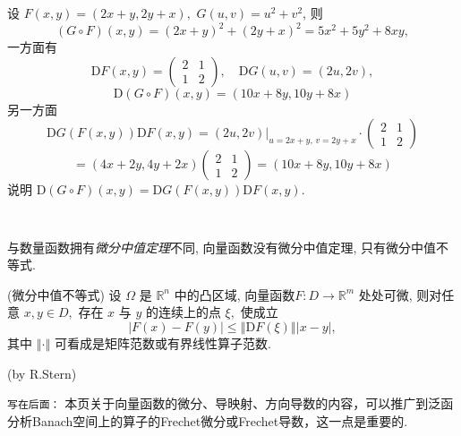 \begin{example}{}
设 $F(x,y)=(2x+y,2y+x),$ $G(u,v)=u^{2}+v^{2}$, 则
\[
(G\circ F)(x,y)=(2x+y)^{2}+(2y+x)^{2}=5x^{2}+5y^{2}+8xy,
\]
一方面有 
$$
\mathrm{D}F(x,y)=\left(\begin{array}{cc}
2& 1\\
1 & 2
\end{array}\right),\quad\mathrm{D}G(u,v)=(2u,2v),
$$
\[
\mathrm{D}(G\circ F)(x,y)=(10x+8y,10y+8x)
\]
另一方面 
$$
\mathrm{D}G(F(x,y))\mathrm{D}F(x,y)  =  \left.(2u,2v)\right|_{u=2x+y,\,v=2y+x}\cdot\left(\begin{array}{cc}
2 & 1\\
1 & 2
\end{array}\right)
$$
$$
  =  (4x+2y,4y+2x)\left(\begin{array}{cc}
2 & 1\\
1 & 2
\end{array}\right)
  =  (10x+8y,10y+8x)
$$
 说明 $\mathrm{D}(G\circ F)(x,y)=\mathrm{D}G(F(x,y))\mathrm{D}F(x,y)$. 
\end{example}

\verb| |

与数量函数拥有\textsl{微分中值定理}不同, 向量函数没有微分中值定理, 只有微分中值不等式. 

\begin{theorem}{(微分中值不等式)}
设 $\Omega$ 是 $\mathbb{R}^{n}$ 中的凸区域, 向量函数$F:D\rightarrow\mathbb{R}^{m}$
处处可微, 则对任意 $x,y\in D,$ 存在 $x$ 与 $y$ 的连续上的点 $\xi,$ 使成立
\[
|F(x)-F(y)|\leqslant\left\Vert \mathrm{D}F(\xi)\right\Vert |x-y|,
\]
其中 $\left\Vert \cdot\right\Vert $ 可看成是矩阵范数或有界线性算子范数. 
\end{theorem}
(by R.Stern)

\verb|写在后面：| 本页关于向量函数的微分、导映射、方向导数的内容，可以推广到泛函分析Banach空间上的算子的Frechet微分或Frechet导数，这一点是重要的.